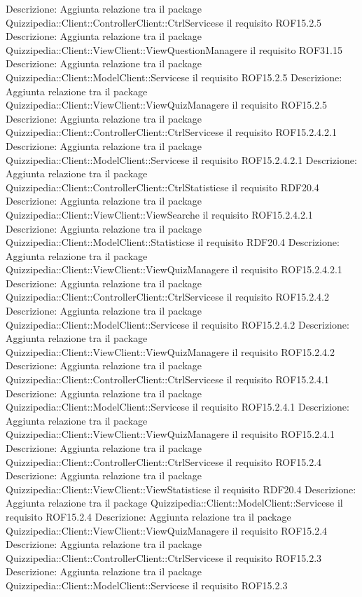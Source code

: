 Descrizione: Aggiunta relazione tra il package Quizzipedia::Client::ControllerClient::CtrlServicese il requisito ROF15.2.5 
Descrizione: Aggiunta relazione tra il package Quizzipedia::Client::ViewClient::ViewQuestionManagere il requisito ROF31.15 
Descrizione: Aggiunta relazione tra il package Quizzipedia::Client::ModelClient::Servicese il requisito ROF15.2.5 
Descrizione: Aggiunta relazione tra il package Quizzipedia::Client::ViewClient::ViewQuizManagere il requisito ROF15.2.5 
Descrizione: Aggiunta relazione tra il package Quizzipedia::Client::ControllerClient::CtrlServicese il requisito ROF15.2.4.2.1 
Descrizione: Aggiunta relazione tra il package Quizzipedia::Client::ModelClient::Servicese il requisito ROF15.2.4.2.1 
Descrizione: Aggiunta relazione tra il package Quizzipedia::Client::ControllerClient::CtrlStatisticse il requisito RDF20.4 
Descrizione: Aggiunta relazione tra il package Quizzipedia::Client::ViewClient::ViewSearche il requisito ROF15.2.4.2.1 
Descrizione: Aggiunta relazione tra il package Quizzipedia::Client::ModelClient::Statisticse il requisito RDF20.4 
Descrizione: Aggiunta relazione tra il package Quizzipedia::Client::ViewClient::ViewQuizManagere il requisito ROF15.2.4.2.1 
Descrizione: Aggiunta relazione tra il package Quizzipedia::Client::ControllerClient::CtrlServicese il requisito ROF15.2.4.2 
Descrizione: Aggiunta relazione tra il package Quizzipedia::Client::ModelClient::Servicese il requisito ROF15.2.4.2 
Descrizione: Aggiunta relazione tra il package Quizzipedia::Client::ViewClient::ViewQuizManagere il requisito ROF15.2.4.2 
Descrizione: Aggiunta relazione tra il package Quizzipedia::Client::ControllerClient::CtrlServicese il requisito ROF15.2.4.1 
Descrizione: Aggiunta relazione tra il package Quizzipedia::Client::ModelClient::Servicese il requisito ROF15.2.4.1 
Descrizione: Aggiunta relazione tra il package Quizzipedia::Client::ViewClient::ViewQuizManagere il requisito ROF15.2.4.1 
Descrizione: Aggiunta relazione tra il package Quizzipedia::Client::ControllerClient::CtrlServicese il requisito ROF15.2.4 
Descrizione: Aggiunta relazione tra il package Quizzipedia::Client::ViewClient::ViewStatisticse il requisito RDF20.4 
Descrizione: Aggiunta relazione tra il package Quizzipedia::Client::ModelClient::Servicese il requisito ROF15.2.4 
Descrizione: Aggiunta relazione tra il package Quizzipedia::Client::ViewClient::ViewQuizManagere il requisito ROF15.2.4 
Descrizione: Aggiunta relazione tra il package Quizzipedia::Client::ControllerClient::CtrlServicese il requisito ROF15.2.3 
Descrizione: Aggiunta relazione tra il package Quizzipedia::Client::ModelClient::Servicese il requisito ROF15.2.3 
